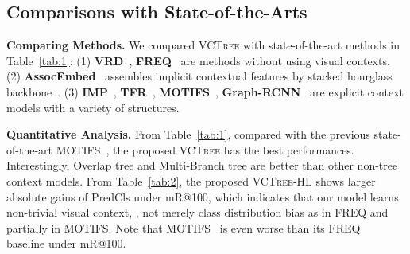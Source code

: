 \documentclass[10pt,twocolumn,letterpaper]{article}
\begin{document}
\begin{table}
\centering
{}
\caption{Accuracies (\%) of various context structures on the VQA2.0 validation set.}
\vspace{-0.1in}
\label{tab:3}
\end{table}

\subsection{Comparisons with State-of-the-Arts}
\noindent\textbf{Comparing Methods.} We compared \textsc{VCTree} with state-of-the-art methods in Table~\ref{tab:1}: (1) \textbf{VRD}~\cite{lu2016visual}, \textbf{FREQ}~\cite{zellers2017neural} are methods without using visual contexts. (2) \textbf{AssocEmbed}~\cite{newell2017pixels} assembles
implicit contextual features by stacked hourglass backbone~\cite{newell2016stacked}. (3) \textbf{IMP}~\cite{xu2017scene}, \textbf{TFR}~\cite{jae2018tensorize}, \textbf{MOTIFS}~\cite{zellers2017neural}, \textbf{Graph-RCNN}~\cite{Yang_2018_ECCV} are explicit context models with a variety of structures.

\noindent\textbf{Quantitative Analysis.} From Table~\ref{tab:1}, compared with the previous state-of-the-art MOTIFS~\cite{zellers2017neural}, the proposed \textsc{VCTree} has the best performances. Interestingly, Overlap tree and Multi-Branch tree are better than other non-tree context models. From Table~\ref{tab:2}, the proposed \textsc{VCTree}-HL shows larger absolute gains of PredCls under mR@100, which indicates that our model learns non-trivial visual context, \ie, not merely class distribution bias as in FREQ and partially in MOTIFS. Note that MOTIFS~\cite{zellers2017neural} is even worse than its FREQ~\cite{zellers2017neural} baseline under mR@100.
\end{document}
